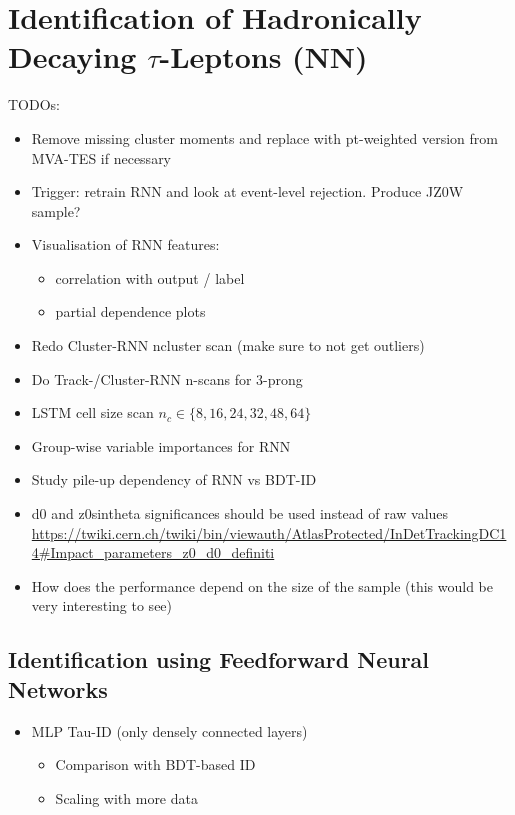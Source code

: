 \chapter{Identification of Hadronically Decaying $\tau$-Leptons (NN)}
\label{sec:rnn}

TODOs:
\begin{itemize}
\item Remove missing cluster moments and replace with pt-weighted version from
  MVA-TES if necessary
\item Trigger: retrain RNN and look at event-level rejection. Produce JZ0W
  sample?
\item Visualisation of RNN features:
  \begin{itemize}
  \item correlation with output / label
  \item partial dependence plots
  \end{itemize}
\item Redo Cluster-RNN ncluster scan (make sure to not get outliers)
\item Do Track-/Cluster-RNN n-scans for 3-prong
\item LSTM cell size scan $n_c \in \{8, 16, 24, 32, 48, 64\}$
\item Group-wise variable importances for RNN
\item Study pile-up dependency of RNN vs BDT-ID
\item d0 and z0sintheta significances should be used instead of raw values
  \url{https://twiki.cern.ch/twiki/bin/viewauth/AtlasProtected/InDetTrackingDC14#Impact_parameters_z0_d0_definiti}
\item How does the performance depend on the size of the sample (this
  would be very interesting to see)
\end{itemize}

\section{Identification using Feedforward Neural Networks}
\label{sec:ffnn_id}

\begin{itemize}
\item MLP Tau-ID (only densely connected layers)
  \begin{itemize}
  \item Comparison with BDT-based ID
  \item Scaling with more data
  \end{itemize}
\end{itemize}

